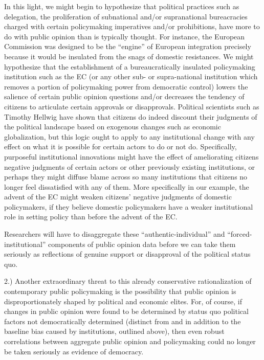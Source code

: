 \documentclass[12pt,book]{article}
\begin{document}
In this light, we might begin to hypothesize that political practices
such as delegation, the proliferation of subnational and/or
supranational bureacracies charged with certain policymaking imperatives
and/or prohibitions, have more to do with public opinion than is
typically thought. For instance, the European Commission was designed to
be the ``engine'' of European integration precisely because it would be
insulated from the snags of domestic resistances. We might hypothesize
that the establishment of a bureaucratically insulated policymaking
institution such as the EC (or any other sub- or supra-national
institution which removes a portion of policymaking power from
democratic control) lowers the salience of certain public opinion
questions and/or decreases the tendency of citizens to articulate
certain approvals or disapprovals. Political scientists such as Timothy
Hellwig have shown that citizens do indeed discount their judgments of
the political landscape based on exogenous changes such as economic
globalization, but this logic ought to apply to any institutional change
with any effect on what it is possible for certain actors to do or not
do. Specifically, purposeful institutional innovations might have the
effect of ameliorating citizens negative judgments of certain actors or
other previously existing institutions, or perhaps they might diffuse
blame across so many institutions that citizens no longer feel
dissatisfied with any of them. More specifically in our example, the
advent of the EC might weaken citizens' negative judgments of domestic
policymakers, if they believe domestic policymakers have a weaker
institutional role in setting policy than before the advent of the EC.

Researchers will have to disaggregate these ``authentic-individual'' and
``forced-institutional'' components of public opinion data before we can
take them seriously as reflections of genuine support or disapproval of
the political status quo.

2.) Another extraordinary threat to this already conservative
rationalization of contemporary public policymaking is the possibility
that public opinion is disproportionately shaped by political and
economic elites. For, of course, if changes in public opinion were found
to be determined by status quo political factors not democratically
determined (distinct from and in addition to the baseline bias caused by
institutions, outlined above), then even robust correlations between
aggregate public opinion and policymaking could no longer be taken
seriously as evidence of democracy.
\end{document}
